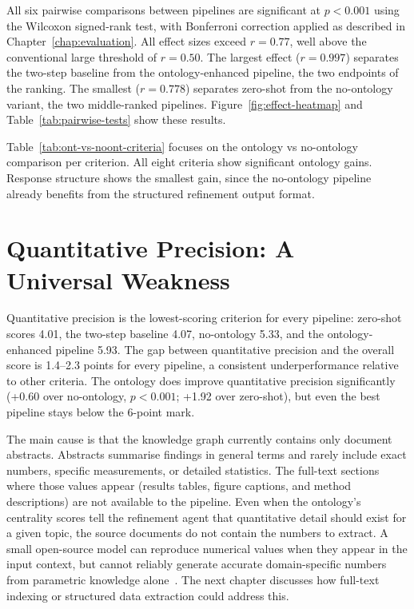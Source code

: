 All six pairwise comparisons between pipelines are significant at $p < 0.001$ using the Wilcoxon signed-rank test, with Bonferroni correction applied as described in Chapter~\ref{chap:evaluation}. All effect sizes exceed $r = 0.77$, well above the conventional large threshold of $r = 0.50$. The largest effect ($r = 0.997$) separates the two-step baseline from the ontology-enhanced pipeline, the two endpoints of the ranking. The smallest ($r = 0.778$) separates zero-shot from the no-ontology variant, the two middle-ranked pipelines. Figure~\ref{fig:effect-heatmap} and Table~\ref{tab:pairwise-tests} show these results.

Table~\ref{tab:ont-vs-noont-criteria} focuses on the ontology vs no-ontology comparison per criterion. All eight criteria show significant ontology gains. Response structure shows the smallest gain, since the no-ontology pipeline already benefits from the structured refinement output format.

\FloatBarrier
\section{Quantitative Precision: A Universal Weakness}
\label{sec:quant-precision}

Quantitative precision is the lowest-scoring criterion for every pipeline: zero-shot scores 4.01, the two-step baseline 4.07, no-ontology 5.33, and the ontology-enhanced pipeline 5.93. The gap between quantitative precision and the overall score is 1.4--2.3 points for every pipeline, a consistent underperformance relative to other criteria. The ontology does improve quantitative precision significantly (+0.60 over no-ontology, $p < 0.001$; +1.92 over zero-shot), but even the best pipeline stays below the 6-point mark.

The main cause is that the knowledge graph currently contains only document abstracts. Abstracts summarise findings in general terms and rarely include exact numbers, specific measurements, or detailed statistics. The full-text sections where those values appear (results tables, figure captions, and method descriptions) are not available to the pipeline. Even when the ontology's centrality scores tell the refinement agent that quantitative detail should exist for a given topic, the source documents do not contain the numbers to extract. A small open-source model can reproduce numerical values when they appear in the input context, but cannot reliably generate accurate domain-specific numbers from parametric knowledge alone~\citep{shi2023large}. The next chapter discusses how full-text indexing or structured data extraction could address this.


